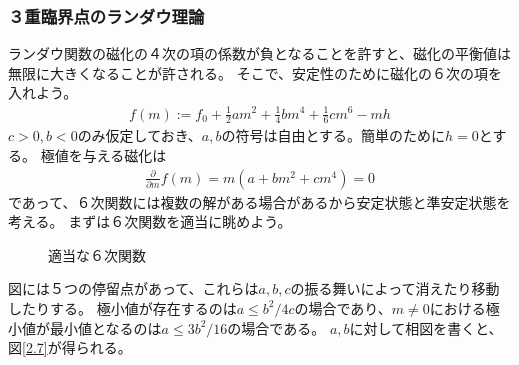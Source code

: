 \documentclass[autodetect-engine,dvipdfmx-if-dvi,ja=standard]{bxjsarticle}
\theoremstyle{break}
\begin{document}
            \subsubsection{３重臨界点のランダウ理論}
                ランダウ関数の磁化の４次の項の係数が負となることを許すと、磁化の平衡値は無限に大きくなることが許される。
                そこで、安定性のために磁化の６次の項を入れよう。
                \begin{align}
                    f(m):=f_0 +\frac{1}{2}am^2 +\frac{1}{4}bm^4+\frac{1}{6}cm^6 -mh
                \end{align}
                $c>0,b<0$のみ仮定しておき、$a,b$の符号は自由とする。簡単のために$h=0$とする。 極値を与える磁化は
                \begin{align}
                    \frac{\partial}{\partial m}f(m)=m(a+bm^2+cm^4)=0
                \end{align}
                であって、６次関数には複数の解がある場合があるから安定状態と準安定状態を考える。
                    まずは６次関数を適当に眺めよう。
                    \begin{figure}
                        \begin{center}
                        \end{center}
                        \caption{適当な６次関数}
                    \end{figure}
                    図には５つの停留点があって、これらは$a,b,c$の振る舞いによって消えたり移動したりする。
                    \fi
                極小値が存在するのは$a\leq b^2/4c$の場合であり、$m\neq 0$における極小値が最小値となるのは$a\leq 3b^2/16$の場合である。
                $a,b$に対して相図を書くと、図\ref{2.7}が得られる。
\end{document}
